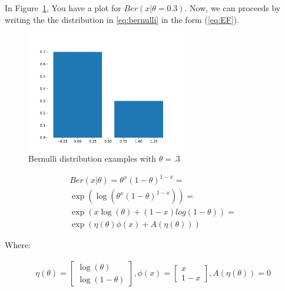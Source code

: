 In Figure~\ref{fig:bernulli-plot}, You have a plot for $Ber(x|\theta=0.3)$.
Now, we can proceeds by writing the the distribution in \ref{eq:bernulli} in the \EF form (\ref{eq:EF}). 
\begin{figure}
	\includegraphics[width=7cm]{GeneralizedLinearModels/figs/bernulli.pdf}	
	\caption{Bernulli distribution examples with $\theta=.3$}
	\label{fig:bernulli-plot}
\end{figure}

\begin{align}
	Ber(x|\theta) = \theta^x(1-\theta)^{1-x} = \\
	\exp(\log(\theta^x(1-\theta)^{1-x})) = \\
	\exp(x\log(\theta)+(1-x)log(1-\theta)) = \\
	\exp(\eta(\theta)\phi(x)+A(\eta(\theta)))
	\label{th:bref}
\end{align}

Where:

\begin{align}
	\eta(\theta) =
	\begin{bmatrix}
		\log(\theta)\\
		\log(1-\theta)
	\end{bmatrix},
	\phi(x) = 
	\begin{bmatrix}
		x\\
		1-x
	\end{bmatrix},
	A(\eta(\theta)) = 0
\end{align}

